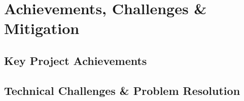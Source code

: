 \chapter{Achievements, Challenges \& Mitigation}
\label{chap:challenges_achievements}

\section{Key Project Achievements}

\section{Technical Challenges \& Problem Resolution}

